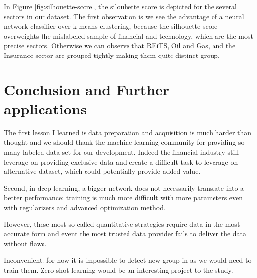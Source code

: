 \documentclass[a4paper,twoside]{article}
\begin{document}
In Figure \ref{fig:silhouette-score}, the silouhette score is depicted for the
several sectors in our dataset. The first observation is we see the advantage
of a neural network classifier over k-means clustering, because the silhouette
score overweights the mislabeled sample of financial and technology, which are
the most precise sectors. Otherwise we can observe that REiTS, Oil and Gas,
and the Insurance sector are grouped tightly making them quite distinct group.


\section{Conclusion and Further applications}
\label{sec:orgc4d755f}

The first lesson I learned is data preparation and acquisition is much harder
than thought and we should thank the machine learning community for providing
so many labeled data set for our development. Indeed the financial industry
still leverage on providing exclusive data and create a difficult task to
leverage on alternative dataset, which could potentially provide added value.

Second, in deep learning, a bigger network does not necessarily translate into
a better performance: training is much more difficult with more parameters
even with regularizers and advanced optimization method.

However, these most so-called quantitative strategies require data in the most
accurate form and event the most trusted data provider fails to deliver the
data without flaws.

Inconvenient: for now it is impossible to detect new group in as we would need
to train them. Zero shot learning would be an interesting project to the
study.
\end{document}
